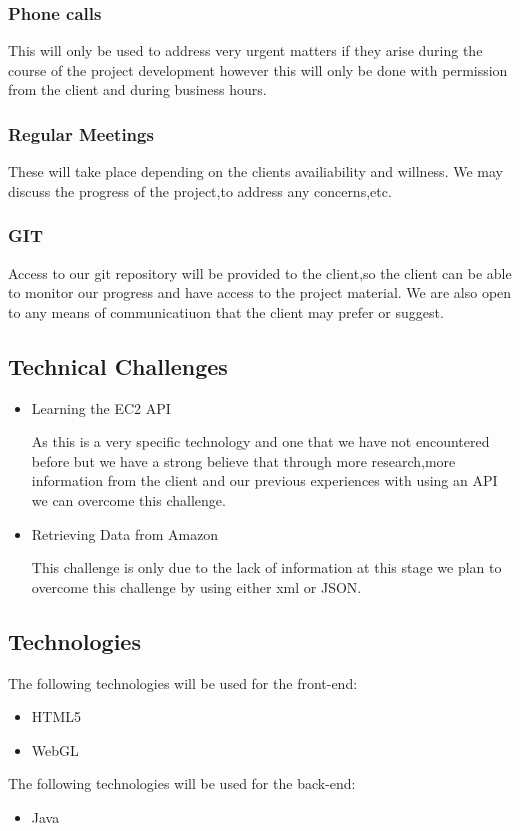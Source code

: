 \documentclass[a4paper,12pt]{article}
\begin{document}
\subsubsection{Phone calls}
This will only be used to address very urgent matters if they arise during the course of the project development
however this will only be done with permission from the client and during business hours.
\subsubsection{Regular Meetings}
These will take place depending on the clients availiability and willness.
We may discuss the progress of the project,to address any concerns,etc.
\subsubsection{GIT}
Access to our git repository will be provided to the client,so the client can be able to monitor
our progress and have access to the project material.
We are also open to any means of communicatiuon that the client may prefer or suggest.
\subsection{Technical Challenges}
\begin{itemize}
\item Learning the EC2 API 

As this is a very specific technology and one that we have not encountered before but we have a strong believe that 
through more research,more information from the client and our previous experiences with using an API we can overcome this challenge.

\item Retrieving Data from Amazon

This challenge is only due to the lack of information at this stage we plan to overcome this challenge by using either xml or JSON.
\end{itemize}
\subsection{Technologies}
The following technologies will be used for the front-end:
\begin{itemize}
\item HTML5
\item WebGL
\end{itemize}
The following technologies will be used for the back-end:
\begin{itemize}
\item Java
\end{itemize}
\end{document}
